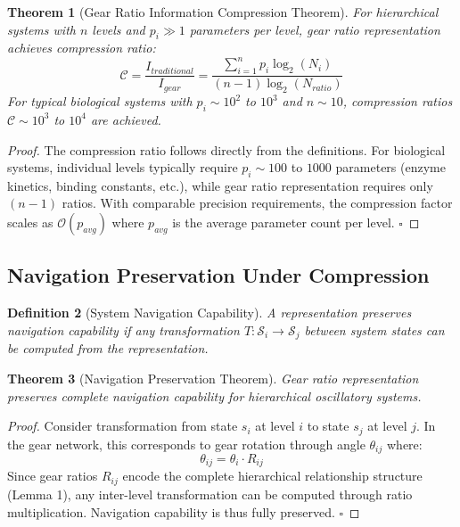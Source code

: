 \documentclass[11pt]{article}
\newtheorem{theorem}{Theorem}[section]
\newtheorem{definition}[theorem]{Definition}
\theoremstyle{remark}
\begin{document}
\begin{theorem}[Gear Ratio Information Compression Theorem]
For hierarchical systems with $n$ levels and $p_i \gg 1$ parameters per level, gear ratio representation achieves compression ratio:
\begin{equation}
\mathcal{C} = \frac{I_{traditional}}{I_{gear}} = \frac{\sum_{i=1}^{n} p_i \log_2(N_i)}{(n-1) \log_2(N_{ratio})}
\label{eq:compression_ratio}
\end{equation}
For typical biological systems with $p_i \sim 10^2$ to $10^3$ and $n \sim 10$, compression ratios $\mathcal{C} \sim 10^3$ to $10^4$ are achieved.
\end{theorem}

\begin{proof}
The compression ratio follows directly from the definitions. For biological systems, individual levels typically require $p_i \sim 100$ to $1000$ parameters (enzyme kinetics, binding constants, etc.), while gear ratio representation requires only $(n-1)$ ratios. With comparable precision requirements, the compression factor scales as $\mathcal{O}(p_{avg})$ where $p_{avg}$ is the average parameter count per level. $\square$
\end{proof}

\subsection{Navigation Preservation Under Compression}

\begin{definition}[System Navigation Capability]
A representation preserves navigation capability if any transformation $T: \mathcal{S}_i \to \mathcal{S}_j$ between system states can be computed from the representation.
\end{definition}

\begin{theorem}[Navigation Preservation Theorem]
Gear ratio representation preserves complete navigation capability for hierarchical oscillatory systems.
\end{theorem}

\begin{proof}
Consider transformation from state $s_i$ at level $i$ to state $s_j$ at level $j$. In the gear network, this corresponds to gear rotation through angle $\theta_{ij}$ where:
$$\theta_{ij} = \theta_i \cdot R_{ij}$$
Since gear ratios $R_{ij}$ encode the complete hierarchical relationship structure (Lemma 1), any inter-level transformation can be computed through ratio multiplication. Navigation capability is thus fully preserved. $\square$
\end{proof}
\end{document}
